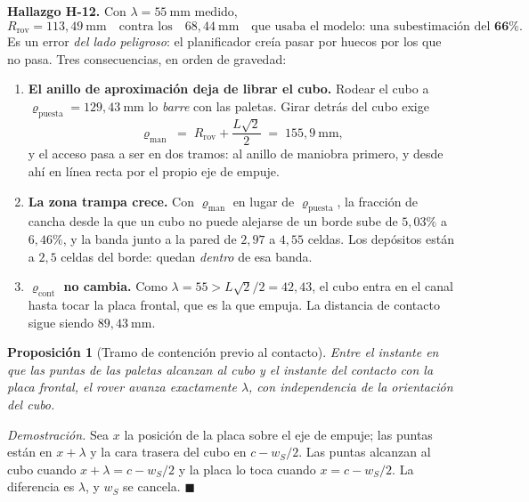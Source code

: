 \documentclass[11pt,a4paper]{article}
\newtheorem{proposicion}[teorema]{Proposición}
\theoremstyle{definition}
\newenvironment{demo}{\par\noindent\textit{Demostración.}\;}{\hfill$\blacksquare$\par\medskip}
\begin{document}
\begin{resultado}
\textbf{Hallazgo H-12.} Con $\lambda = 55\ \mathrm{mm}$ medido,
\[
  R_{\mathrm{rov}} = 113{,}49\ \mathrm{mm} \quad\text{contra los}\quad 68{,}44\ \mathrm{mm}
  \quad\text{que usaba el modelo: una subestimación del } \mathbf{66\%}.
\]
Es un error \emph{del lado peligroso}: el planificador creía pasar por huecos por los que
no pasa. Tres consecuencias, en orden de gravedad:
\begin{enumerate}[label=(\alph*),leftmargin=2.2em,itemsep=3pt]
\item \textbf{El anillo de aproximación deja de librar el cubo.} Rodear el cubo a
      $\varrho_{\mathrm{puesta}} = 129{,}43\ \mathrm{mm}$ lo \emph{barre} con las paletas.
      Girar detrás del cubo exige
      \[
        \varrho_{\mathrm{man}} \;=\; R_{\mathrm{rov}} + \frac{L\sqrt2}{2} \;=\; 155{,}9\ \mathrm{mm},
      \]
      y el acceso pasa a ser en dos tramos: al anillo de maniobra primero, y desde ahí en
      línea recta por el propio eje de empuje.
\item \textbf{La zona trampa crece.} Con $\varrho_{\mathrm{man}}$ en lugar de
      $\varrho_{\mathrm{puesta}}$, la fracción de cancha desde la que un cubo no puede
      alejarse de un borde sube de $5{,}03\%$ a $6{,}46\%$, y la banda junto a la pared de
      $2{,}97$ a $4{,}55$ celdas. Los depósitos están a $2{,}5$ celdas del borde: quedan
      \emph{dentro} de esa banda.
\item \textbf{$\varrho_{\mathrm{cont}}$ no cambia.} Como $\lambda = 55 > L\sqrt2/2 = 42{,}43$,
      el cubo entra en el canal hasta tocar la placa frontal, que es la que empuja. La
      distancia de contacto sigue siendo $89{,}43\ \mathrm{mm}$.
\end{enumerate}
\end{resultado}

\begin{proposicion}[Tramo de contención previo al contacto]
\label{prop:tramo}
Entre el instante en que las puntas de las paletas alcanzan al cubo y el instante del
contacto con la placa frontal, el rover avanza exactamente $\lambda$, con independencia de
la orientación del cubo.
\end{proposicion}

\begin{demo}
Sea $x$ la posición de la placa sobre el eje de empuje; las puntas están en $x+\lambda$ y
la cara trasera del cubo en $c - w_S/2$. Las puntas alcanzan al cubo cuando
$x+\lambda = c - w_S/2$ y la placa lo toca cuando $x = c - w_S/2$. La diferencia es
$\lambda$, y $w_S$ se cancela.
\end{demo}
\end{document}
